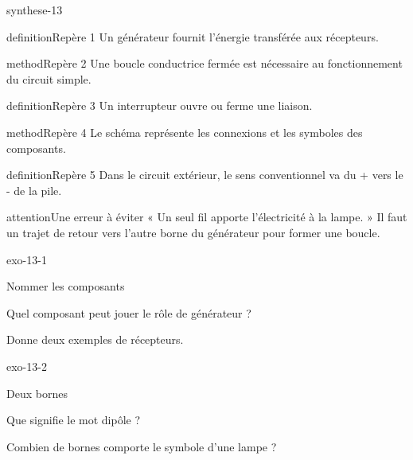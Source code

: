 \documentclass[12pt,twoside,openany]{book}
\begin{document}
\begin{pcFiche}{synthese-13}
\begin{pcEncadre}{definition}{Repère 1}
Un générateur fournit l’énergie transférée aux récepteurs.\par
\end{pcEncadre}
\begin{pcEncadre}{method}{Repère 2}
Une boucle conductrice fermée est nécessaire au fonctionnement du circuit simple.\par
\end{pcEncadre}
\begin{pcEncadre}{definition}{Repère 3}
Un interrupteur ouvre ou ferme une liaison.\par
\end{pcEncadre}
\begin{pcEncadre}{method}{Repère 4}
Le schéma représente les connexions et les symboles des composants.\par
\end{pcEncadre}
\begin{pcEncadre}{definition}{Repère 5}
Dans le circuit extérieur, le sens conventionnel va du + vers le - de la pile.\par
\end{pcEncadre}
\begin{pcEncadre}{attention}{Une erreur à éviter}
« Un seul fil apporte l’électricité à la lampe. » Il faut un trajet de retour vers l’autre borne du générateur pour former une boucle.\par
\end{pcEncadre}
\end{pcFiche}
\clearpage{}
\begin{blocLivre}{exo-13-1}
\begin{exercice}[1]{Nommer les composants}
\begin{questions}
\item Quel composant peut jouer le rôle de générateur ?
\item Donne deux exemples de récepteurs.
\end{questions}
\end{exercice}\end{blocLivre}
\begin{blocLivre}{exo-13-2}
\begin{exercice}[1]{Deux bornes}
\begin{questions}
\item Que signifie le mot dipôle ?
\item Combien de bornes comporte le symbole d’une lampe ?
\end{questions}
\end{exercice}\end{blocLivre}
\end{document}
